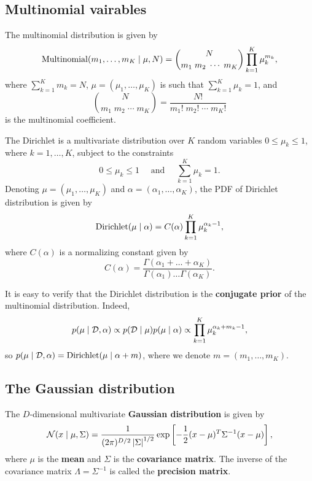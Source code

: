 \documentclass[a4paper]{article}
\begin{document}
\subsection{Multinomial vairables}

\begin{defi}
The multinomial distribution is given by 
\[
\operatorname{Multinomial}(m_1, \dots, m_K \mid \mu, N)
= \binom{N}{m_1 \; m_2 \; \cdots \; m_K} 
\prod_{k=1}^K \mu_k^{m_k},
\]
where $\sum_{k=1}^K m_k = N$, 
$\mu = (\mu_1, \dots, \mu_K)$ is such that 
$\sum_{k=1}^K \mu_k = 1$, and 
\[
\binom{N}{m_1 \; m_2 \; \cdots \; m_K}
= \frac{N!}{m_1! \; m_2! \; \cdots \; m_K!}
\]
is the multinomial coefficient.
\end{defi}

\begin{defi}
The Dirichlet is a multivariate distribution over $K$ 
random variables $0 \leq \mu_k \leq 1$,
where $k = 1, \dots, K$, subject to the constraints
\[
0 \leq \mu_k \leq 1 \quad 
\text{ and } \quad \sum_{k=1}^K \mu_k = 1.
\]
Denoting $\mu = (\mu_1, \dots, \mu_K)$ and 
$\alpha = (\alpha_1, \dots, \alpha_K)$,
the PDF of Dirichlet distribution is given by 
\[
\operatorname{Dirichlet}(\mu \mid \alpha)
= C(\alpha) \prod_{k=1}^K \mu_k^{\alpha_k - 1},
\]
where $C(\alpha)$ is a normalizing constant given by 
\[
C(\alpha) = \frac{\Gamma(\alpha_1 + \dots + \alpha_K)}
{\Gamma(\alpha_1) \dots \Gamma(\alpha_K)}.
\]
\end{defi}

It is easy to verify that the Dirichlet distribution
is the \textbf{conjugate prior} of the multinomial distribution. 
Indeed, 
\[
p(\mu \mid \mathcal{D}, \alpha)
\propto p(\mathcal{D} \mid \mu) p(\mu \mid \alpha) 
\propto \prod_{k=1}^K \mu_k^{\alpha_k + m_k - 1},
\]
so $p(\mu \mid \mathcal{D}, \alpha)
= \operatorname{Dirichlet}(\mu \mid \alpha + m)$, where we denote 
$m = (m_1, \dots, m_K)$.

\subsection{The Gaussian distribution}

\begin{defi}
The $D$-dimensional multivariate 
\textbf{Gaussian distribution} is given by 
\[
\mathcal{N} (x \mid \mu, \Sigma) 
= \frac{1}{(2\pi)^{D / 2} \left\lvert \Sigma\right\rvert^{1 / 2}}
\exp \left[ -\frac{1}{2} (x - \mu)^T \Sigma^{-1} (x - \mu) 
\right],
\]
where $\mu$ is the \textbf{mean} and $\Sigma$ is the 
\textbf{covariance matrix}.
The inverse of the covariance matrix $\Lambda = \Sigma^{-1}$ 
is called the \textbf{precision matrix}.
\end{defi}
\end{document}
